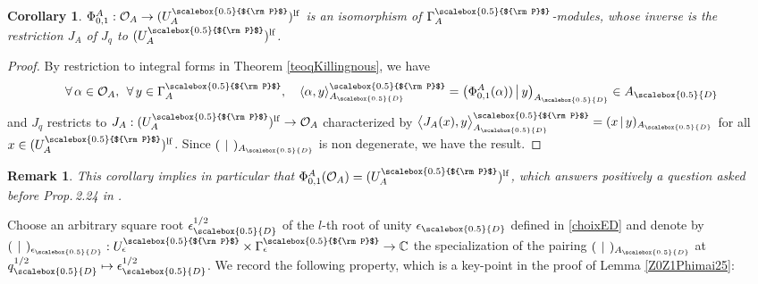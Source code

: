 \documentclass[11pt]{amsart}
\newtheorem{cor}[teo]{Corollary}
\newtheorem{remark}[teo]{Remark}
\newcommand{\e}{\epsilon}
\newcommand{\Oo}{\mathcal{O}}
\newcommand{\qD}{q_{\scalebox{0.5}{D}}}
\newcommand{\eD}{\epsilon_{\scalebox{0.5}{D}}}
\newcommand{\AD}{A_{\scalebox{0.5}{D}}}
\newcommand{\Pup}{{\scalebox{0.5}{${\rm P}$}}}
\begin{document}
\begin{cor}\label{cor:dec25PhiA} $\Phi_{0,1}^A :  \Oo_A\to (U_A^\Pup)^{\rm lf}$ is an isomorphism of $\Gamma_A^\Pup$-modules, whose inverse is the restriction $J_A$ of $J_q$ to $(U_A^\Pup)^{\rm lf}$.
\end{cor}
\begin{proof} 
By restriction to integral forms in Theorem \ref{teoqKillingnous}, we have 
\begin{equation}\label{KillingPhi01Int}
\forall \, \alpha\in \Oo_A, \:\: \forall \, y\in \Gamma_A^{\Pup}, \quad \langle \alpha, y\rangle_{\AD}^\Pup = \bigl(\Phi_{0,1}^{A}(\alpha)) \,\big|\, y\bigr)_{\AD} \in \AD
\end{equation}
and $J_q$ restricts to $J_A : (U_A^\Pup)^{\mathrm{lf}} \to \Oo_A$ characterized by $\bigl\langle J_A(x),y \bigr\rangle_{\AD}^\Pup= (x \,|\, y )_{\AD} $ for all $x \in (U_A^{\Pup})^{\mathrm{lf}}$. Since $(\:\,|\,\:)_{\AD}$ is non degenerate, we have the result.
\end{proof}
\begin{remark}{\rm This corollary implies in particular that $\Phi_{0,1}^A(\Oo_A) = (U_A^\Pup)^{\rm lf}$, which answers positively a question asked before Prop.\,2.24 in \cite{BR2}.}
\end{remark}
Choose an arbitrary square root $\eD^{1/2}$ of the $l$-th root of unity $\eD$ defined in \eqref{choixED} and denote by $(\:\,|\,\:)_{\eD} : U_\e^\Pup \times \Gamma_\e^\Pup \to \mathbb{C}$ the specialization of the pairing $(\:\,|\,\:)_{\AD}$ at $\qD^{1/2} \mapsto \eD^{1/2}$. We record the following property, which is a key-point in the proof of Lemma \ref{Z0Z1Phimai25}:
\end{document}
